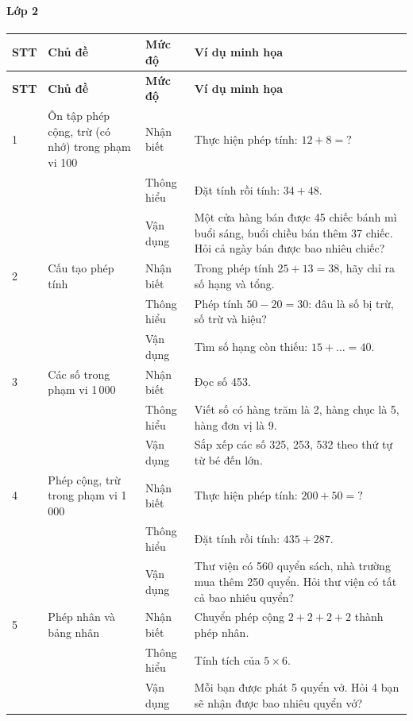 \paragraph{Lớp 2}
\renewcommand{\arraystretch}{1.3}
\begin{longtable}{|>{\centering\arraybackslash}m{0.8cm}|m{3.5cm}|>{\centering\arraybackslash}m{2cm}|m{7.5cm}|}
	\hline
	\textbf{STT} & \textbf{Chủ đề} & \textbf{Mức độ} & \textbf{Ví dụ minh họa} \\
	\hline
	\endfirsthead
	\hline
	\textbf{STT} & \textbf{Chủ đề} & \textbf{Mức độ} & \textbf{Ví dụ minh họa} \\
	\hline
	\endhead
	\hline
	\endfoot

	1 & Ôn tập phép cộng, trừ (có nhớ) trong phạm vi 100
	& Nhận biết & Thực hiện phép tính: $12+8=?$ \\
	\cline{3-4}
	& & Thông hiểu & Đặt tính rồi tính: $34+48$. \\
	\cline{3-4}
	& & Vận dụng & Một cửa hàng bán được 45 chiếc bánh mì buổi sáng, buổi chiều bán thêm 37 chiếc. Hỏi cả ngày bán được bao nhiêu chiếc? \\
	\hline

	2 & Cấu tạo phép tính
	& Nhận biết & Trong phép tính $25+13=38$, hãy chỉ ra số hạng và tổng. \\
	\cline{3-4}
	& & Thông hiểu & Phép tính $50-20=30$: đâu là số bị trừ, số trừ và hiệu? \\
	\cline{3-4}
	& & Vận dụng & Tìm số hạng còn thiếu: $15 + \ldots = 40$. \\
	\hline

	3 & Các số trong phạm vi 1\,000
	& Nhận biết & Đọc số 453. \\
	\cline{3-4}
	& & Thông hiểu & Viết số có hàng trăm là 2, hàng chục là 5, hàng đơn vị là 9. \\
	\cline{3-4}
	& & Vận dụng & Sắp xếp các số 325, 253, 532 theo thứ tự từ bé đến lớn. \\
	\hline

	4 & Phép cộng, trừ trong phạm vi 1\,000
	& Nhận biết & Thực hiện phép tính: $200+50=?$ \\
	\cline{3-4}
	& & Thông hiểu & Đặt tính rồi tính: $435+287$. \\
	\cline{3-4}
	& & Vận dụng & Thư viện có 560 quyển sách, nhà trường mua thêm 250 quyển. Hỏi thư viện có tất cả bao nhiêu quyển? \\
	\hline

	5 & Phép nhân và bảng nhân
	& Nhận biết & Chuyển phép cộng $2+2+2+2$ thành phép nhân. \\
	\cline{3-4}
	& & Thông hiểu & Tính tích của $5 \times 6$. \\
	\cline{3-4}
	& & Vận dụng & Mỗi bạn được phát 5 quyển vở. Hỏi 4 bạn sẽ nhận được bao nhiêu quyển vở? \\
	\hline


\end{longtable}

